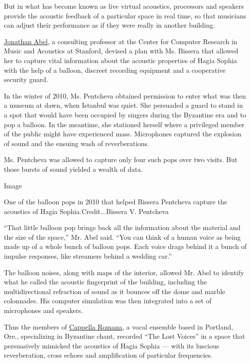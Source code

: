 But in what has become known as live virtual acoustics, processors and
speakers provide the acoustic feedback of a particular space in real
time, so that musicians can adjust their performance as if they were
really in another building.

\href{https://ccrma.stanford.edu/people/jonathan-abel}{Jonathan Abel}, a
consulting professor at the Center for Computer Research in Music and
Acoustics at Stanford, devised a plan with Ms. Bissera that allowed her
to capture vital information about the acoustic properties of Hagia
Sophia with the help of a balloon, discreet recording equipment and a
cooperative security guard.

In the winter of 2010, Ms. Pentcheva obtained permission to enter what
was then a museum at dawn, when Istanbul was quiet. She persuaded a
guard to stand in a spot that would have been occupied by singers during
the Byzantine era and to pop a balloon. In the meantime, she stationed
herself where a privileged member of the public might have experienced
mass. Microphones captured the explosion of sound and the ensuing wash
of reverberations.

Ms. Pentcheva was allowed to capture only four such pops over two
visits. But those bursts of sound yielded a wealth of data.

Image

One of the balloon pops in 2010 that helped Bissera Pentcheva capture
the acoustics of Hagia Sophia.Credit...Bissera V. Pentcheva

``That little balloon pop brings back all the information about the
material and the size of the space,'' Mr. Abel said. ``You can think of
a human voice as being made up of a whole bunch of balloon pops. Each
voice drags behind it a bunch of impulse responses, like streamers
behind a wedding car.''

The balloon noises, along with maps of the interior, allowed Mr. Abel to
identify what he called the acoustic fingerprint of the building,
including the multidirectional refraction of sound as it bounces off the
dome and marble colonnades. His computer simulation was then integrated
into a set of microphones and speakers.

Thus the members of \href{https://cappellaromana.org/}{Cappella Romana},
a vocal ensemble based in Portland, Ore., specializing in Byzantine
chant, recorded ``The Lost Voices'' in a space that persuasively
mimicked the acoustics of Hagia Sophia --- with its luscious
reverberation, cross echoes and amplification of particular frequencies.

